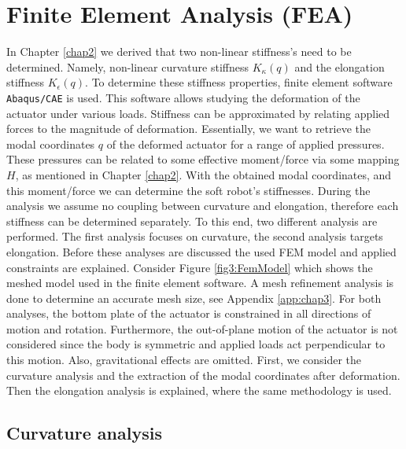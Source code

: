 
\section{Finite Element Analysis (FEA)}


In Chapter \ref{chap2} we derived that two non-linear stiffness's need to be determined. Namely, non-linear curvature stiffness $K_\kappa(q)$ and the elongation stiffness $K_\epsilon(q)$. To determine these stiffness properties, finite element software \verb+Abaqus/CAE+ is used. This software allows studying the deformation of the actuator under various loads. Stiffness can be approximated by relating applied forces to the magnitude of deformation. Essentially, we want to retrieve the modal coordinates $q$ of the deformed actuator for a range of applied pressures. These pressures can be related to some effective moment/force via some mapping $H$, as mentioned in Chapter \ref{chap2}. With the obtained modal coordinates, and this moment/force we can determine the soft robot's stiffnesses. During the analysis we assume no coupling between curvature and elongation, therefore each stiffness can be determined separately. To this end, two different analysis are performed. The first analysis focuses on curvature, the second analysis targets elongation. Before these analyses are discussed the used FEM model and applied constraints are explained. Consider Figure \ref{fig3:FemModel} which shows the meshed model used in the finite element software. A mesh refinement analysis is done to determine an accurate mesh size, see Appendix \ref{app:chap3}. For both analyses, the bottom plate of the actuator is constrained in all directions of motion and rotation. Furthermore, the out-of-plane motion of the actuator is not considered since the body is symmetric and applied loads act perpendicular to this motion. Also, gravitational effects are omitted. First, we consider the curvature analysis and the extraction of the modal coordinates after deformation. Then the elongation analysis is explained, where the same methodology is used. 


\subsection{Curvature analysis}

